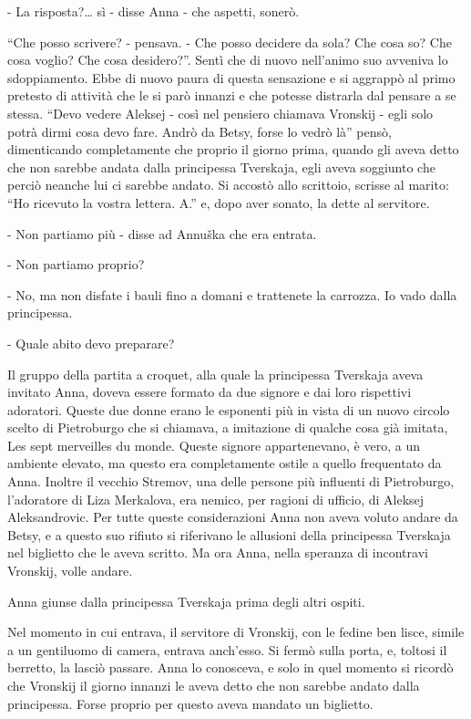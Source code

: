 - La risposta?\ldots{} sì - disse Anna - che aspetti, sonerò. 

``Che posso scrivere? - pensava. - Che posso decidere da sola? Che cosa so? Che cosa voglio? Che cosa desidero?''. Sentì che di nuovo nell'animo suo avveniva lo sdoppiamento. Ebbe di nuovo paura di questa sensazione e si aggrappò al primo pretesto di attività che le si parò innanzi e che potesse distrarla dal pensare a se stessa. ``Devo vedere Aleksej - così nel pensiero chiamava Vronskij - egli solo potrà dirmi cosa devo fare. Andrò da Betsy, forse lo vedrò là'' pensò, dimenticando completamente che proprio il giorno prima, quando gli aveva detto che non sarebbe andata dalla principessa Tverskaja, egli aveva soggiunto che perciò neanche lui ci sarebbe andato. Si accostò allo scrittoio, scrisse al marito: ``Ho ricevuto la vostra lettera. A.'' e, dopo aver sonato, la dette al servitore. 

- Non partiamo più - disse ad Annuška che era entrata. 

- Non partiamo proprio? 

- No, ma non disfate i bauli fino a domani e trattenete la carrozza. Io vado dalla principessa. 

- Quale abito devo preparare? 

Il gruppo della partita a croquet, alla quale la principessa Tverskaja aveva invitato Anna, doveva essere formato da due signore e dai loro rispettivi adoratori. Queste due donne erano le esponenti più in vista di un nuovo circolo scelto di Pietroburgo che si chiamava, a imitazione di qualche cosa già imitata, Les sept merveilles du monde. Queste signore appartenevano, è vero, a un ambiente elevato, ma questo era completamente ostile a quello frequentato da Anna. Inoltre il vecchio Stremov, una delle persone più influenti di Pietroburgo, l'adoratore di Liza Merkalova, era nemico, per ragioni di ufficio, di Aleksej Aleksandrovic. Per tutte queste considerazioni Anna non aveva voluto andare da Betsy, e a questo suo rifiuto si riferivano le allusioni della principessa Tverskaja nel biglietto che le aveva scritto. Ma ora Anna, nella speranza di incontravi Vronskij, volle andare. 

Anna giunse dalla principessa Tverskaja prima degli altri ospiti. 

Nel momento in cui entrava, il servitore di Vronskij, con le fedine ben lisce, simile a un gentiluomo di camera, entrava anch'esso. Si fermò sulla porta, e, toltosi il berretto, la lasciò passare. Anna lo conosceva, e solo in quel momento si ricordò che Vronskij il giorno innanzi le aveva detto che non sarebbe andato dalla principessa. Forse proprio per questo aveva mandato un biglietto. 

